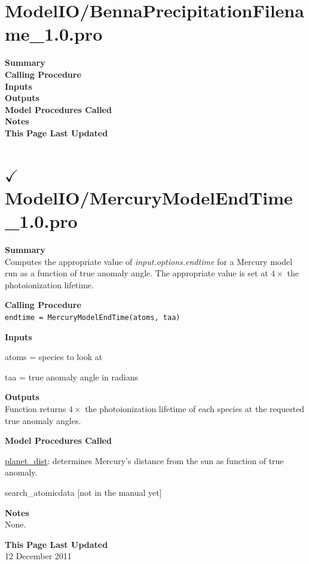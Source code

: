 \documentclass[11pt]{article}
\newcommand\descrip[1]{\textsf{\textbf{\large{#1}}}\\}
\begin{document}
\section{ModelIO/BennaPrecipitationFilename\_1.0.pro}
\label{sec:BennaPrecipitationFilename}

\descrip{Summary}

\descrip{Calling Procedure}

\descrip{Inputs}

\descrip{Outputs}

\descrip{Model Procedures Called}

\descrip{Notes}

\descrip{This Page Last Updated}

\clearpage

\section{$\checkmark$ModelIO/MercuryModelEndTime\_1.0.pro} \label{sec:MercuryModelEndTime}

\descrip{Summary}
Computes the appropriate value of \textit{input.options.endtime} for a Mercury
model run as a function of true anomaly angle. The appropriate value is set at
$4\times$ the photoionization lifetime.

\descrip{Calling Procedure}
\verb+endtime = MercuryModelEndTime(atoms, taa)+

\descrip{Inputs}
\begin{compactenum} \listup
\item atoms = species to look at
\item taa = true anomaly angle in radians
\end{compactenum}

\descrip{Outputs}
Function returns $4\times$ the photoionization lifetime of each species at the
requested true anomaly angles.

\descrip{Model Procedures Called}
\begin{compactenum} \listup
\item \hyperref[sec:planet_dist]{planet\_dist}: determines Mercury's distance
from the sun as function of true anomaly.
\item search\_atomicdata [not in the manual yet]
\end{compactenum}

\descrip{Notes}
None.

\descrip{This Page Last Updated}
12 December 2011
\end{document}
